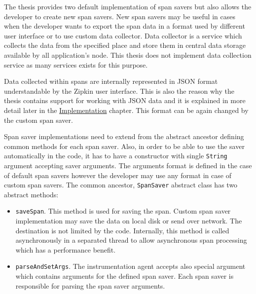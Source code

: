 The thesis provides two default implementation of span savers but also allows the developer to create new span savers. New span savers may be useful in cases when the developer wants to export the span data in a format used by different user interface or to use custom data collector. Data collector is a service which collects the data from the specified place and store them in central data storage available by all application's node. This thesis does not implement data collection service as many services exists for this purpose. 

Data collected within spans are internally represented in JSON format understandable by the Zipkin user interface. This is also the reason why the thesis contains support for working with JSON data and  it is explained in more detail later in the  \hyperref[chap:implementation]{Implementation} chapter. This format can be again changed by the custom span saver.

Span saver implementations need to extend from the abstract ancestor defining common methods for each span saver. Also, in order to be able to use the saver automatically in the code, it has to have a constructor with single \texttt{String} argument accepting saver arguments. The arguments format is defined in the case of default span savers however the developer may use any format in case of custom span savers. The common ancestor, \texttt{SpanSaver} abstract class has two abstract methods:
\begin{itemize}
	\item \texttt{saveSpan}. This method is used for saving the span. Custom span saver implementation may save the data on local disk or send over network. The destination is not limited by the code. Internally, this method is called asynchronously in a separated thread to allow asynchronous span processing which has a performance benefit.
	\item \texttt{parseAndSetArgs}. The instrumentation agent accepts also special argument which contains arguments for the defined span saver. Each span saver is responsible for parsing the span saver arguments.
\end{itemize}

